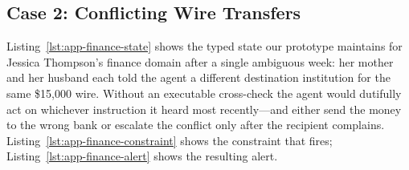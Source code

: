 \subsection{Case 2: Conflicting Wire Transfers}

Listing~\ref{lst:app-finance-state} shows the typed state our prototype maintains for Jessica Thompson's finance domain after a single ambiguous week: her mother and her husband each told the agent a different destination institution for the same \$15{,}000 wire. Without an executable cross-check the agent would dutifully act on whichever instruction it heard most recently---and either send the money to the wrong bank or escalate the conflict only after the recipient complains. Listing~\ref{lst:app-finance-constraint} shows the constraint that fires; Listing~\ref{lst:app-finance-alert} shows the resulting alert.

